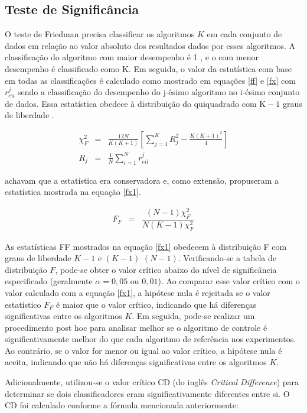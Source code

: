 \subsection{Teste de Signific\^ancia}


O teste de Friedman precisa classificar os algoritmos $K$ em cada conjunto de dados em relação ao valor absoluto dos resultados dados por esses algoritmos. A classificação do algoritmo com maior desempenho é 1 , e o com menor desempenho é classificado como $\mathrm{K}$. Em seguida, o valor da estatística com base em todas as classificações é calculado como mostrado em equações \eqref{ff} e \eqref{fx} com $r_{e u}^j$ sendo a classificação do desempenho do j-ésimo algoritmo no i-ésimo conjunto de dados. Essa estatística obedece à distribuição do quiquadrado com $\mathrm{K}-1$ graus de liberdade \cite{Liu2022}.

\begin{eqnarray}
	\chi_F^2 & =&\frac{12 N}{K(K+1)}\left[\sum_{j=1}^K R_j^2-\frac{K(K+1)^2}{4}\right] \label{ff}\\
	R_j & =&\frac{1}{N} \sum_{i=1}^N r_{e i l}^j \label{fx}
\end{eqnarray}

achavam que a estatística era conservadora e, como extensão, propuseram a estatística mostrada na equação \eqref{fx1}.

\begin{eqnarray}
	F_F&=&\dfrac{(N-1) \chi_F^2}{N(K-1) \chi_F^2}\label{fx1}
\end{eqnarray}

As estatísticas FF mostrados na equação \eqref{fx1} obedecem à distribuição F com graus de liberdade $K-1$ e $(K-1)$ $(N-1)$. Verificando-se a tabela de distribuição $F$, pode-se obter o valor crítico abaixo do nível de significância especificado (geralmente $\alpha = 0,05$ ou $0,01$). Ao comparar esse valor crítico com o valor calculado com a equação \eqref{fx1}, a hipótese nula é rejeitada se o valor estatístico $F_F$ é maior que o valor crítico, indicando que há diferenças significativas entre os algoritmos $K$. Em seguida, pode-se realizar um procedimento post hoc para analisar melhor se o algoritmo de controle é significativamente melhor do que cada algoritmo de referência nos experimentos. Ao contrário, se o valor for menor ou igual ao valor crítico, a hipótese nula é aceita, indicando que não há diferenças significativas entre os algoritmos $K$.


Adicionalmente, utilizou-se o valor crítico CD (do inglês \textit{Critical Difference}) para determinar se dois classificadores eram significativamente diferentes entre si. O CD foi calculado conforme a fórmula mencionada anteriormente:

